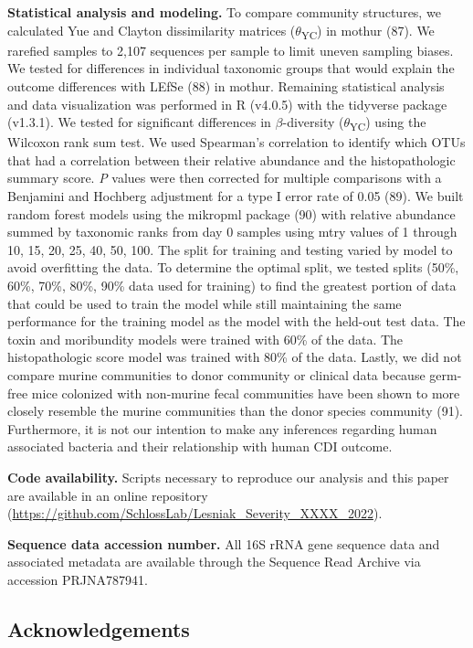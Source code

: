 \documentclass[
  12pt,
]{article}
\begin{document}
\textbf{Statistical analysis and modeling.} To compare community
structures, we calculated Yue and Clayton dissimilarity matrices
(\(\theta\)\textsubscript{YC}) in mothur (87). We rarefied samples to
2,107 sequences per sample to limit uneven sampling biases. We tested
for differences in individual taxonomic groups that would explain the
outcome differences with LEfSe (88) in mothur. Remaining statistical
analysis and data visualization was performed in R (v4.0.5) with the
tidyverse package (v1.3.1). We tested for significant differences in
\(\beta\)-diversity (\(\theta\)\textsubscript{YC}) using the Wilcoxon
rank sum test. We used Spearman's correlation to identify which OTUs
that had a correlation between their relative abundance and the
histopathologic summary score. \emph{P} values were then corrected for
multiple comparisons with a Benjamini and Hochberg adjustment for a type
I error rate of 0.05 (89). We built random forest models using the
mikropml package (90) with relative abundance summed by taxonomic ranks
from day 0 samples using mtry values of 1 through 10, 15, 20, 25, 40,
50, 100. The split for training and testing varied by model to avoid
overfitting the data. To determine the optimal split, we tested splits
(50\%, 60\%, 70\%, 80\%, 90\% data used for training) to find the
greatest portion of data that could be used to train the model while
still maintaining the same performance for the training model as the
model with the held-out test data. The toxin and moribundity models were
trained with 60\% of the data. The histopathologic score model was
trained with 80\% of the data. Lastly, we did not compare murine
communities to donor community or clinical data because germ-free mice
colonized with non-murine fecal communities have been shown to more
closely resemble the murine communities than the donor species community
(91). Furthermore, it is not our intention to make any inferences
regarding human associated bacteria and their relationship with human
CDI outcome.

\textbf{Code availability.} Scripts necessary to reproduce our analysis
and this paper are available in an online repository
(\url{https://github.com/SchlossLab/Lesniak_Severity_XXXX_2022}).

\textbf{Sequence data accession number.} All 16S rRNA gene sequence data
and associated metadata are available through the Sequence Read Archive
via accession PRJNA787941.

\hypertarget{acknowledgements}{%
\subsection{Acknowledgements}\label{acknowledgements}}
\end{document}
